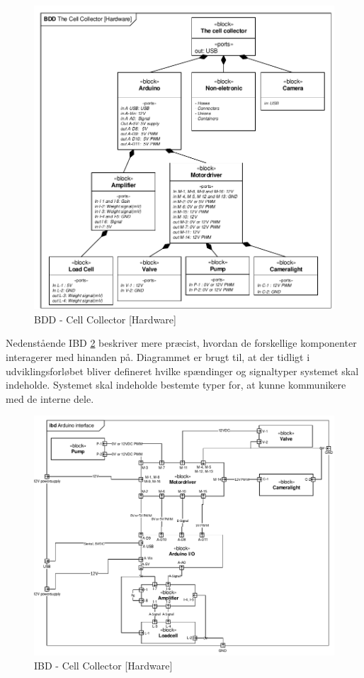 \begin{figure}[H]
	\centering
	\includegraphics[width=1\textwidth]{pdf/BDD_Hardware.pdf}
	\caption{BDD - Cell Collector [Hardware]}
	\label{fig:bdd_Hardware}
\end{figure}

Nedenstående IBD \ref{fig:ibd_Hardware} beskriver mere præcist, hvordan de forskellige komponenter interagerer med hinanden på. Diagrammet er brugt til, at der tidligt i udviklingsforløbet bliver defineret hvilke spændinger og signaltyper systemet skal indeholde. Systemet skal indeholde bestemte typer for, at kunne kommunikere med de interne dele.


\begin{figure}[H]
	\centering
	\includegraphics[width=1\textwidth]{pdf/IBD_Hardware(Arduino).pdf}
	\caption{IBD - Cell Collector [Hardware]}
	\label{fig:ibd_Hardware}
\end{figure}

